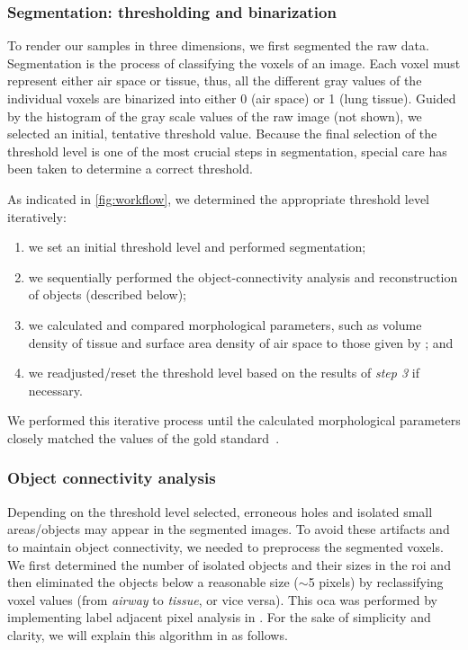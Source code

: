 \subsubsection{Segmentation: thresholding and binarization}
To render our samples in three dimensions, we first segmented the raw data. Segmentation is the process of classifying the voxels of an image. Each voxel must represent either air space or tissue, thus, all the different gray values of the individual voxels are binarized into either 0 (air space) or 1 (lung tissue). Guided by the histogram of the gray scale values of the raw image (not shown), we selected an initial, tentative threshold value. Because the final selection of the threshold level is one of the most crucial steps in segmentation, special care has been taken to determine a correct threshold.

As indicated in \autoref{fig:workflow}, we determined the appropriate threshold level iteratively: 
\begin{enumerate}
	\item we set an initial threshold level and performed segmentation;
	\item we sequentially performed the object-connectivity analysis and \threed reconstruction of objects (described below);
	\item we calculated and compared morphological parameters, such as volume density of tissue and surface area density of air space to those given by \citet{Tschanz2003}; and
	\item we readjusted/reset the threshold level based on the results of \emph{step 3} if necessary.
\end{enumerate}

We performed this iterative process until the calculated morphological parameters closely matched the values of the gold standard~\cite{Tschanz2003}.

\subsubsection{Object connectivity analysis}
Depending on the threshold level selected, erroneous holes and isolated small areas/objects may appear in the segmented images. To avoid these artifacts and to maintain object connectivity, we needed to preprocess the segmented voxels. We first determined the number of isolated objects and their sizes in the \ac{roi} and then eliminated the objects below a reasonable size ($\sim$5 pixels) by reclassifying voxel values (from \emph{airway} to \emph{tissue}, or vice versa). This \ac{oca} was performed by implementing label adjacent pixel analysis in \threed \cite{Ballard1982,Davies1990,Gonzalez1992}. For the sake of simplicity and clarity, we will explain this algorithm in \twod as follows.

